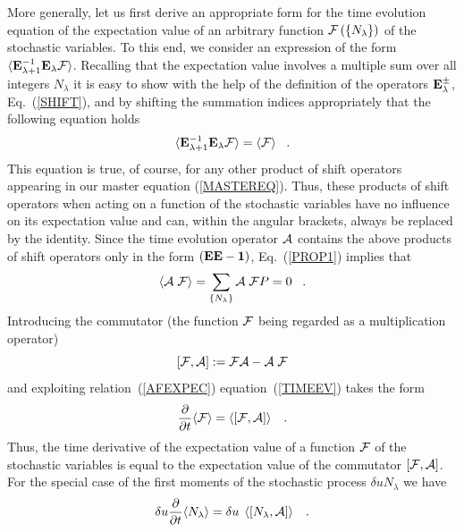 More generally, let us first derive an appropriate form for the time
evolution equation of the expectation value of an arbitrary function
${\cal{F}} \left( \{ N_{\lambda} \} \right)$ of the stochastic
variables.
To this end, we consider an expression of the form
$\langle {\bf{E}}_{\lambda + 1}^{-1}
{\bf{E}}_{\lambda} {\cal{F}} \rangle$.
Recalling that the expectation
value involves a multiple sum over all integers
$N_{\lambda}$ it is easy
to show with the help of the definition of the operators
${\bf{E}}^{\pm}_{\lambda}$, Eq.~(\ref{SHIFT}), and by shifting
the summation indices appropriately that the following equation
holds
\begin{equation}         \label{PROP1}
\langle {\bf{E}}_{\lambda +1}^{-1} {\bf{E}}_{\lambda}
{\cal{F}} \rangle
= \langle {\cal{F}} \rangle \;\;\; .
\end{equation}
This equation is true, of course, for any other product of
shift operators
appearing in our master equation (\ref{MASTEREQ}).
Thus, these products of shift operators when
acting on a function of the stochastic variables have no influence
on its expectation value and can, within the angular brackets,
always be replaced by the identity. Since the time evolution
operator
${\cal{A}}$ contains the above products of shift operators
only in the
form $({\bf{E}} {\bf{E}} - {\bf{1}})$, Eq.~(\ref{PROP1})
implies that
\begin{equation}
\label{AFEXPEC}
\langle {\cal{A}} \; {\cal{F}} \rangle =
\sum_{\left\{N_{\lambda} \right\}}
{\cal{A}}\; {\cal{F}} P = 0
\;\;\; .
\end{equation}
Introducing the commutator (the function ${\cal{F}}$ being
regarded as a
multiplication operator)
\begin{equation}
\left[ {\cal{F}}, {\cal{A}} \right] := {\cal{F A}} - {\cal{A \; F}}
\end{equation}
and exploiting relation~(\ref{AFEXPEC}) equation~(\ref{TIMEEV})
takes the form
\begin{equation}     \label{HGLN}
\frac{\partial}{\partial t} \langle {\cal{F}} \rangle = \left\langle
\left[ {\cal{F}} , {\cal{A}} \right] \right\rangle
\;\;\; .
\end{equation}
Thus, the time derivative of the expectation value of a function
${\cal{F}}$ of the stochastic variables is equal to the expectation
value of the commutator $\left[{\cal{F}},{\cal{A}}\right]$.
For the special case of the first moments of the stochastic process
$\delta u N_{\lambda}$ we have
\begin{equation}
\label{MOMENT2}
\delta u \frac{\partial}{\partial t} \langle N_{\lambda} \rangle
= \delta u \; \left\langle \left[ N_{\lambda} , {\cal{A}} \right]
\right\rangle
\;\;\; .
\end{equation}
